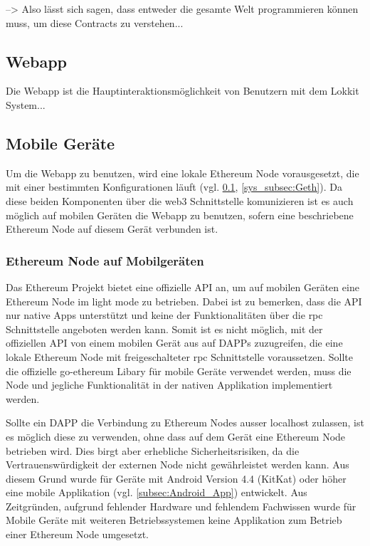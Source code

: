 --> Also lässt sich sagen, dass entweder die gesamte Welt programmieren können muss, um diese Contracts zu verstehen...


\subsection{Webapp}
\label{subsec:Webapp}
Die Webapp ist die Hauptinteraktionsmöglichkeit von Benutzern mit dem Lokkit System...

\subsection{Mobile Geräte}
Um die Webapp zu benutzen, wird eine lokale Ethereum Node vorausgesetzt, die mit einer bestimmten Konfigurationen läuft (vgl. \ref{subsec:Webapp}, \ref{sys_subsec:Geth}). Da diese beiden Komponenten über die web3 Schnittstelle komunizieren ist es auch möglich auf mobilen Geräten die Webapp zu benutzen, sofern eine beschriebene Ethereum Node auf diesem Gerät verbunden ist.

\subsubsection{Ethereum Node auf Mobilgeräten}
Das Ethereum Projekt bietet eine offizielle API an, um auf mobilen Geräten eine Ethereum Node im light mode zu betrieben. Dabei ist zu bemerken, dass die API nur native Apps unterstützt und keine der Funktionalitäten über die rpc Schnittstelle angeboten werden kann. Somit ist es nicht möglich, mit der offiziellen API von einem mobilen Gerät aus auf \acrshort{DAPPs} zuzugreifen, die eine lokale Ethereum Node mit freigeschalteter rpc Schnittstelle voraussetzen. Sollte die offizielle go-ethereum Libary für mobile Geräte verwendet werden, muss die Node und jegliche Funktionalität in der nativen Applikation implementiert werden.\cite[wiki/Mobile: Introduction]{go-ethereum}

Sollte ein \acrshort{DAPP} die Verbindung zu Ethereum Nodes ausser localhost zulassen, ist es möglich diese zu verwenden, ohne dass auf dem Gerät eine Ethereum Node betrieben wird. Dies birgt aber erhebliche Sicherheitsrisiken, da die Vertrauenswürdigkeit der externen Node nicht gewährleistet werden kann. Aus diesem Grund wurde für Geräte mit Android Version 4.4 (KitKat) oder höher eine mobile Applikation (vgl. \ref{subsec:Android_App}) entwickelt. Aus Zeitgründen, aufgrund fehlender Hardware und fehlendem Fachwissen wurde für Mobile Geräte mit weiteren Betriebssystemen keine Applikation zum Betrieb einer Ethereum Node umgesetzt.
